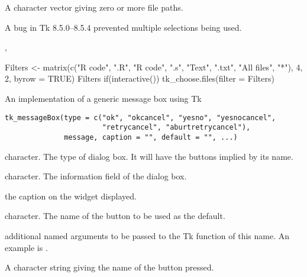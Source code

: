%
\begin{Value}
A character vector giving zero or more file paths.
\end{Value}
%
\begin{Note}\relax
A bug in Tk 8.5.0--8.5.4 prevented multiple selections being used.
\end{Note}
%
\begin{SeeAlso}\relax
{}, 
\end{SeeAlso}
%
\begin{Examples}
\begin{ExampleCode}
Filters <- matrix(c("R code", ".R", "R code", ".s",
                    "Text", ".txt", "All files", "*"),
                  4, 2, byrow = TRUE)
Filters
if(interactive()) tk_choose.files(filter = Filters)
\end{ExampleCode}
\end{Examples}
%
\begin{Description}\relax
An implementation of a generic message box using Tk
\end{Description}
%
\begin{Usage}
\begin{verbatim}
tk_messageBox(type = c("ok", "okcancel", "yesno", "yesnocancel",
                       "retrycancel", "aburtretrycancel"),
              message, caption = "", default = "", ...)
\end{verbatim}
\end{Usage}
%
\begin{Arguments}
\begin{ldescription}
\item[\code{type}] character. The type of dialog box. It will have the
buttons implied by its name.
\item[\code{message}] character. The information field of the dialog box.
\item[\code{caption}] the caption on the widget displayed.
\item[\code{default}] character. The name of the button to be used as the
default.
\item[\code{...}] additional named arguments to be passed to the Tk
function of this name.  An example is .
\end{ldescription}
\end{Arguments}
%
\begin{Value}
A character string giving the name of the button pressed.
\end{Value}
